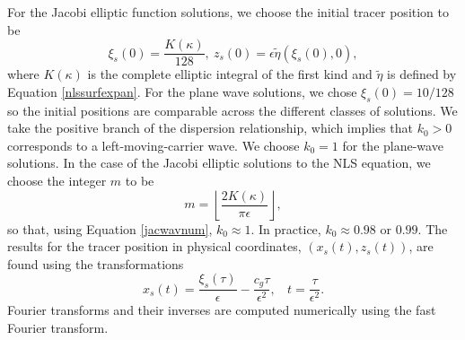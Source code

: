 \documentclass{JFM_Style/jfm}
\begin{document}
For the Jacobi elliptic function solutions, we choose the initial tracer position to be 
\[
\xi_{s}(0) = \frac{K(\kappa)}{128}, ~ z_{s}(0) = \epsilon \tilde{\eta}(\xi_{s}(0),0),
\]
where $K(\kappa)$ is the complete elliptic integral of the first kind and $\tilde{\eta}$ is defined by Equation \eqref{nlssurfexpan}.  For the plane wave solutions, we chose $\xi_s(0)=10/128$ so the initial positions are comparable across the different classes of solutions.  We take the positive branch of the dispersion relationship, which implies that $k_{0}>0$ corresponds to a left-moving-carrier wave.  We choose $k_{0}=1$ for the plane-wave solutions.  In the case of the Jacobi elliptic solutions to the NLS equation, we choose the integer $m$ to be 
\[
m = \left\lfloor \frac{2K(\kappa)}{\pi \epsilon}\right\rfloor,
\]
so that, using Equation \eqref{jacwavnum}, $k_{0}\approx 1$.  In practice, $k_{0}\approx0.98$ or $0.99$.  The results for the tracer position in physical coordinates, $(x_{s}(t),z_{s}(t))$, are found using the transformations 
\[
x_{s}(t) = \frac{\xi_{s}(\tau)}{\epsilon}-\frac{c_{g}\tau}{\epsilon^{2}}, ~~~~ t = \frac{\tau}{\epsilon^{2}}.
\]
Fourier transforms and their inverses are computed numerically using the fast Fourier transform. 
\end{document}
